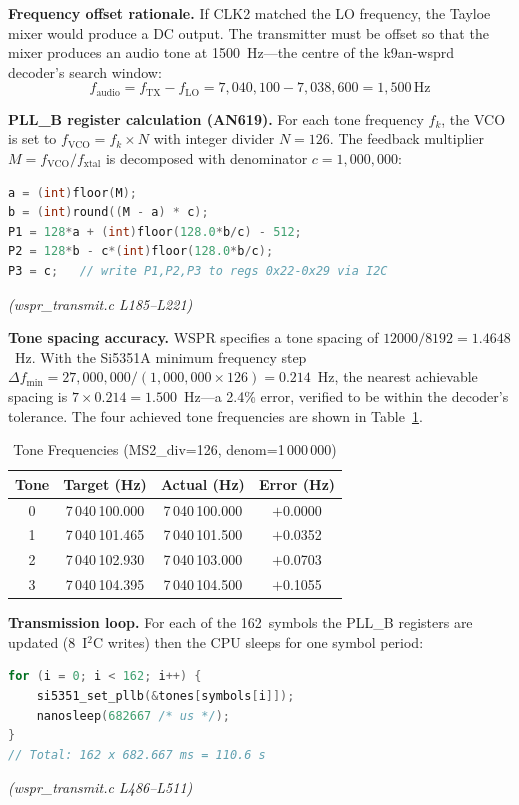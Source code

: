 \documentclass[conference]{IEEEtran}
\begin{document}
\textbf{Frequency offset rationale.} If CLK2 matched the LO frequency, the Tayloe
mixer would produce a DC output. The transmitter must be offset so that the mixer
produces an audio tone at 1500~Hz---the centre of the k9an-wsprd decoder's search
window:
%
\begin{equation}
  f_\text{audio} = f_\text{TX} - f_\text{LO}
                 = 7{,}040{,}100 - 7{,}038{,}600 = 1{,}500\,\text{Hz}
  \label{eq:offset}
\end{equation}

\textbf{PLL\_B register calculation (AN619).} For each tone frequency $f_k$, the
VCO is set to $f_\text{VCO} = f_k \times N$ with integer divider $N=126$. The
feedback multiplier $M = f_\text{VCO}/f_\text{xtal}$ is decomposed with
denominator $c = 1{,}000{,}000$:
%
\begin{lstlisting}[style=cstyle,language=C]
a = (int)floor(M);
b = (int)round((M - a) * c);
P1 = 128*a + (int)floor(128.0*b/c) - 512;
P2 = 128*b - c*(int)floor(128.0*b/c);
P3 = c;   // write P1,P2,P3 to regs 0x22-0x29 via I2C
\end{lstlisting}
%
\textit{(wspr\_transmit.c L185--L221)}

\textbf{Tone spacing accuracy.} WSPR specifies a tone spacing of
$12000/8192 = 1.4648$~Hz. With the Si5351A minimum frequency step
$\Delta f_\text{min} = 27{,}000{,}000 / (1{,}000{,}000 \times 126) = 0.214$~Hz,
the nearest achievable spacing is $7 \times 0.214 = 1.500$~Hz---a 2.4\% error,
verified to be within the decoder's tolerance. The four achieved tone frequencies
are shown in Table~\ref{tab:tones}.

\begin{table}[t]
  \centering
  \caption{Tone Frequencies (MS2\_div=126, denom=1\,000\,000)}
  \label{tab:tones}
  \begin{tabular}{cccc}
    \toprule
    Tone & Target (Hz) & Actual (Hz) & Error (Hz) \\
    \midrule
    0 & 7\,040\,100.000 & 7\,040\,100.000 & $+$0.0000 \\
    1 & 7\,040\,101.465 & 7\,040\,101.500 & $+$0.0352 \\
    2 & 7\,040\,102.930 & 7\,040\,103.000 & $+$0.0703 \\
    3 & 7\,040\,104.395 & 7\,040\,104.500 & $+$0.1055 \\
    \bottomrule
  \end{tabular}
\end{table}

\textbf{Transmission loop.} For each of the 162~symbols the PLL\_B registers are
updated (8~I$^2$C writes) then the CPU sleeps for one symbol period:
%
\begin{lstlisting}[style=cstyle,language=C]
for (i = 0; i < 162; i++) {
    si5351_set_pllb(&tones[symbols[i]]);
    nanosleep(682667 /* us */);
}
// Total: 162 x 682.667 ms = 110.6 s
\end{lstlisting}
%
\textit{(wspr\_transmit.c L486--L511)}
\end{document}
